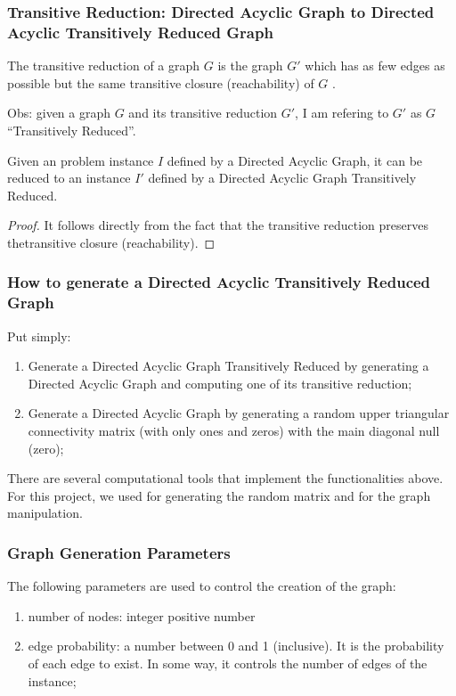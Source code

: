 \subsubsection{Transitive Reduction: Directed Acyclic Graph to Directed Acyclic Transitively Reduced Graph}

\begin{defn}
    The transitive reduction of a graph $G$ is the graph $G'$ which has as few edges as possible but the same transitive closure (reachability) of $G$ \cite{bib:transitive-reduction}.
\end{defn}

Obs: given a graph $G$ and its transitive reduction $G'$, I am refering to $G'$ as $G$ ``Transitively Reduced''.

\begin{lemma}
    \label{lemma:reduction-2}
    Given an problem instance $I$ defined by a Directed Acyclic Graph, it can be reduced to an instance $I'$ defined by a Directed Acyclic Graph Transitively Reduced.
\end{lemma}

\begin{proof}
    It follows directly from the fact that the transitive reduction preserves thetransitive closure (reachability).
\end{proof}

\subsubsection{How to generate a Directed Acyclic Transitively Reduced Graph}

Put simply:

\begin{enumerate}
    \item Generate a Directed Acyclic Graph Transitively Reduced by generating a Directed Acyclic Graph and computing one of its transitive reduction;
    \item Generate a Directed Acyclic Graph by generating a random upper triangular connectivity matrix (with only ones and zeros) with the main diagonal null (zero);
\end{enumerate}

There are several computational tools that implement the functionalities above. For this project, we used \cite{bib:numpy} for generating the random matrix and \cite{bib:networkx} for the graph manipulation.

\subsubsection{Graph Generation Parameters}

The following parameters are used to control the creation of the graph:

\begin{enumerate}
    \item number of nodes: integer positive number
    \item edge probability: a number between 0 and 1 (inclusive). It is the probability of each edge to exist. In some way, it controls the number of edges of the instance;
\end{enumerate}
